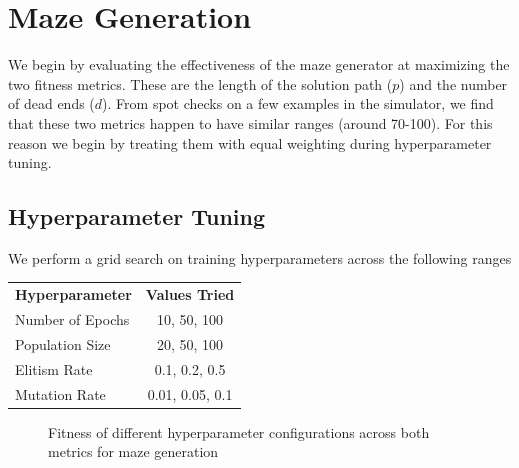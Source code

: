 \section{Maze Generation}

We begin by evaluating the effectiveness of the maze generator at maximizing the two fitness metrics. These are the length of the solution path ($p$) and the number of dead ends ($d$). From spot checks on a few examples in the simulator, we find that these two metrics happen to have similar ranges (around 70-100). For this reason we begin by treating them with equal weighting during hyperparameter tuning.\\

\subsection{Hyperparameter Tuning}

We perform a grid search on training hyperparameters across the following ranges
\begin{center}
    \begin{tabular}{ l c }
        \bf Hyperparameter & \bf Values Tried\\
        Number of Epochs & 10, 50, 100\\
        Population Size & 20, 50, 100\\
        Elitism Rate & 0.1, 0.2, 0.5\\
        Mutation Rate & 0.01, 0.05, 0.1\\
    \end{tabular}
\end{center}

\begin{figure}[!h]
\centering
            \hfill
            \hfill
            \caption{Fitness of different hyperparameter configurations across both metrics for maze generation}
\label{fig:maze-hyperparam}
\end{figure}

